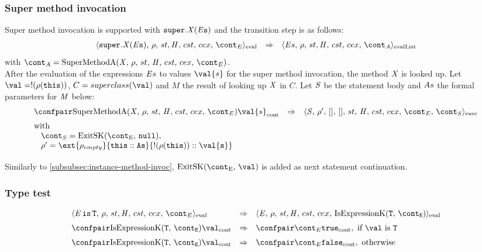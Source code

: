 \documentclass{article}
\begin{document}
\subsubsection{Super method invocation}
\label{subsubsec:super-method-invocation}
\newcommand{\SuperMethodInvocation}[2]{\tt{super}.#1(#2)}
\newcommand{\SuperMethodA}{\mathrm{SuperMethodA}(\idmeta,\,\env,\,\strace,\,\handler,\,\cstrace,\,\cex,\,\econt)}
Super method invocation is supported with $\SuperMethodInvocation{\idmeta}{\expressionsmeta}$ and the transition step is as follows:
\[
  \begin{array}{lcl}
	\cesktrans{
		\evalconf{\SuperMethodInvocation{\idmeta}{\expressionsmeta}}{\env}{\strace}{\cstrace}{\cex}{\econt}}{
		\evallistconf{\expressionsmeta}{\env}{\strace}{\cstrace}{\cex}{\acont}}
  \end{array}
\]
with $\acont = \SuperMethodA$.\\[2mm]
After the evaluation of the expressions $\mathit{E}{s}$ to values $\val{s}$ for the super method invocation, the method $\mathit{X}$ is looked up. Let $\val = \deref{(\env(\this))}$, $C = \superclass{\val}$ and $M$ the result of looking up $\mathit{X}$ in $C$. Let $\mathit{S}$ be the statement body and $As$ the formal parameters for $\mathit{M}$ below:
\[
  \begin{array}{lcl}
	\cesktrans{
		\contconf{\SuperMethodA}{\val{s}}}{
		\execconf{\stmt}{\env'}{[]}{[]}{\handler}{\cstrace}{\cex}{\econt}{\scont}}
	\\[2mm]
	\textrm{with }\\
	\hspace{3mm}\scont = \ExitSK{\tt{null}},\\
	\hspace{3mm}\env' = \ext{\env_{empty}}{\this :: \formals}{\deref{(\env(\this))} :: \val{s}}\\[2mm]
  \end{array}
\]
Similarly to \ref{subsubsec:instance-method-invoc}, $\ExitSK{\val}$ is added as next statement continuation.

\subsubsection{Type test}
\label{subsubsec:type-test}
\newcommand{\IsExpressionK}{\mathrm{IsExpressionK}(\tt{T},\,\econt)}
\[
  \begin{array}{lcl}
	\cesktrans{
		\evalconf{\IsExpression{\expressionmeta}{\tt{T}}}{\env}{\strace}{\cstrace}{\cex}{\econt}}{
		\evalconf{\expressionmeta}{\env}{\strace}{\cstrace}{\cex}{\IsExpressionK}}\\[2mm]

	\cesktrans{
		\contconf{\IsExpressionK}{\val}}{
		\contconf{\econt}{\true}},
		\textrm{ if }\val \textrm{ is } \tt{T}\\[2mm]

	\cesktrans{
		\contconf{\IsExpressionK}{\val}}{
		\contconf{\econt}{\false}}, \textrm{ otherwise}
  \end{array}
\]
\end{document}
